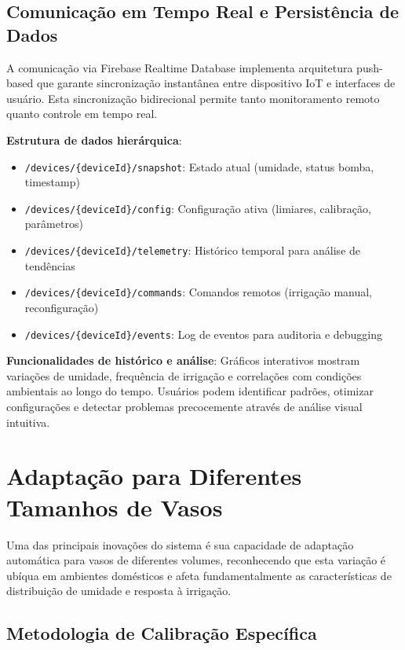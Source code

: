 \subsection{Comunicação em Tempo Real e Persistência de Dados}

A comunicação via Firebase Realtime Database implementa arquitetura push-based que garante sincronização instantânea entre dispositivo IoT e interfaces de usuário. Esta sincronização bidirecional permite tanto monitoramento remoto quanto controle em tempo real.

\textbf{Estrutura de dados hierárquica}:
\begin{itemize}
\item \texttt{/devices/\{deviceId\}/snapshot}: Estado atual (umidade, status bomba, timestamp)
\item \texttt{/devices/\{deviceId\}/config}: Configuração ativa (limiares, calibração, parâmetros)
\item \texttt{/devices/\{deviceId\}/telemetry}: Histórico temporal para análise de tendências
\item \texttt{/devices/\{deviceId\}/commands}: Comandos remotos (irrigação manual, reconfiguração)
\item \texttt{/devices/\{deviceId\}/events}: Log de eventos para auditoria e debugging
\end{itemize}

\textbf{Funcionalidades de histórico e análise}: Gráficos interativos mostram variações de umidade, frequência de irrigação e correlações com condições ambientais ao longo do tempo. Usuários podem identificar padrões, otimizar configurações e detectar problemas precocemente através de análise visual intuitiva.

\section{Adaptação para Diferentes Tamanhos de Vasos}

Uma das principais inovações do sistema é sua capacidade de adaptação automática para vasos de diferentes volumes, reconhecendo que esta variação é ubíqua em ambientes domésticos e afeta fundamentalmente as características de distribuição de umidade e resposta à irrigação.

\subsection{Metodologia de Calibração Específica}

